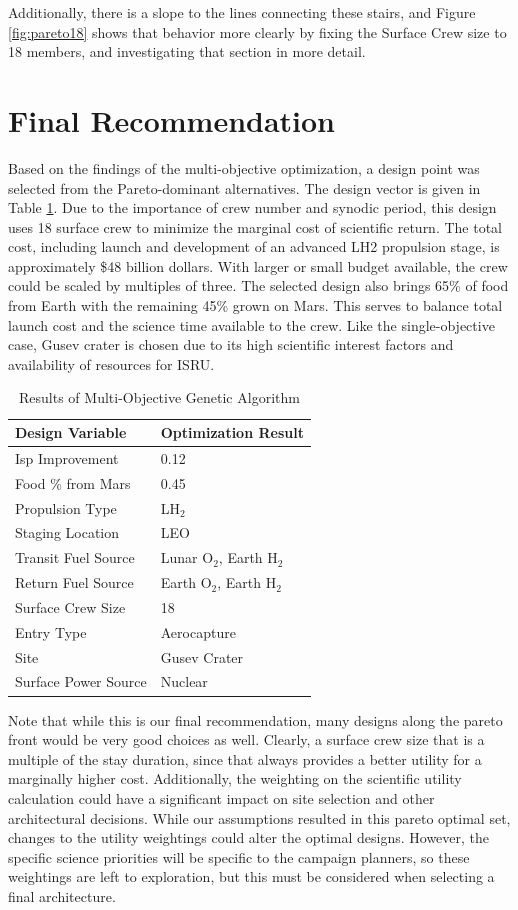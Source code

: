 \documentclass[]{aiaa-pretty}
\begin{document}
Additionally, there is a slope to the lines connecting these stairs, and Figure \ref{fig:pareto18} shows that behavior more clearly by fixing the Surface Crew size to 18 members, and investigating that section in more detail.

\section{Final Recommendation}

Based on the findings of the multi-objective optimization, a design point was selected from the Pareto-dominant alternatives. The design vector is given in Table \ref{tab:GAmulti}. Due to the importance of crew number and synodic period, this design uses 18 surface crew to minimize the marginal cost of scientific return. The total cost, including launch and development of an advanced LH2 propulsion stage, is approximately \$48 billion dollars. With larger or small budget available, the crew could be scaled by multiples of three. The selected design also brings 65\% of food from Earth with the remaining 45\% grown on Mars. This serves to balance total launch cost and the science time available to the crew. Like the single-objective case, Gusev crater is chosen due to its high scientific interest factors and availability of resources for ISRU. 

\begin{table}[h!]
	\centering
	\caption{Results of Multi-Objective Genetic Algorithm}
	\label{tab:GAmulti}
	\begin{tabular}{ll}
	\textbf{Design Variable} & \textbf{Optimization Result}\\ \hline
	Isp Improvement & 0.12 \\
	Food \% from Mars & 0.45 \\
	Propulsion Type & LH$_2$ \\
	Staging Location & LEO \\
	Transit Fuel Source & Lunar O$_2$, Earth H$_2$ \\
	Return Fuel Source & Earth O$_2$, Earth H$_2$ \\
	Surface Crew Size & 18\\
	Entry Type & Aerocapture \\
	Site & Gusev Crater \\
	Surface Power Source & Nuclear\\
	\end{tabular}
\end{table}

Note that while this is our final recommendation, many designs along the pareto front would be very good choices as well. Clearly, a surface crew size that is a multiple of the stay duration, since that always provides a better utility for a marginally higher cost. Additionally, the weighting on the scientific utility calculation could have a significant impact on site selection and other architectural decisions.  While our assumptions resulted in this pareto optimal set, changes to the utility weightings could alter the optimal designs. However, the specific science priorities will be specific to the campaign planners, so these weightings are left to exploration, but this must be considered when selecting a final architecture.  
\end{document}
